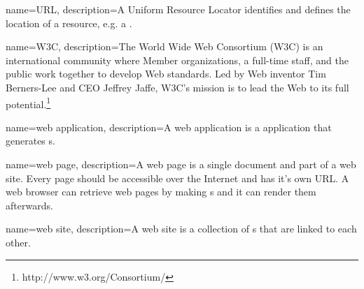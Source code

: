 {
  name=URL,
  description={A Uniform Resource Locator identifies and defines the location of a resource, e.g. a \webPage{}.}
}

{
  name=W3C,
  description={The World Wide Web Consortium (W3C) is an international community where Member organizations, a full-time staff, and the public work together to develop Web standards. Led by Web inventor Tim Berners-Lee and CEO Jeffrey Jaffe, W3C's mission is to lead the Web to its full potential.\footnote{http://www.w3.org/Consortium/}}
}

{
  name=web application,
  description={A web application is a application that generates \webPage{}s.}
}

{
  name=web page,
  description={A web page is a single document and part of a web site. 
  Every page should be accessible over the Internet and has it's own URL.
  A web browser can retrieve web pages by making \httpRequest{}s and it can render them afterwards.}
}

{
  name=web site,
  description={A web site is a collection of \webPage{}s that are linked to each other.}
}

